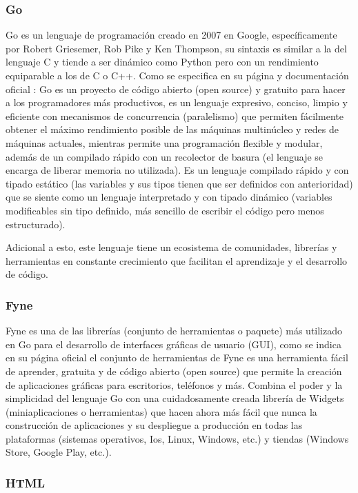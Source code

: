 \subsubsection{Go}
Go es un lenguaje de programación creado en 2007 en Google, específicamente por
Robert Griesemer, Rob Pike y Ken Thompson, su sintaxis es similar a la del lenguaje
C y tiende a ser dinámico como Python pero con un rendimiento equiparable a los
de C o C++. Como se especifica en su página y documentación oficial
\textcite{GolangDocumentacion}: Go es un proyecto de código abierto (open source)
y gratuito
para hacer a los programadores más productivos, es un lenguaje expresivo, conciso,
limpio y eficiente con mecanismos de concurrencia (paralelismo) que permiten fácilmente
obtener el máximo rendimiento posible de las máquinas multinúcleo y redes de máquinas
actuales, mientras permite una programación flexible y modular, además de un compilado
rápido con un recolector de basura (el lenguaje se encarga de liberar memoria
no utilizada).
Es un lenguaje compilado rápido y con tipado estático (las variables y sus tipos tienen que
ser definidos con anterioridad) que se siente como un lenguaje interpretado y
con tipado dinámico (variables modificables sin tipo definido, más sencillo de
escribir el código pero menos estructurado).

Adicional a esto, este lenguaje tiene un ecosistema de comunidades, librerías y
herramientas en constante crecimiento que facilitan el aprendizaje y el desarrollo
de código.

\subsubsection{Fyne}

Fyne es una de las librerías (conjunto de herramientas o paquete) más utilizado
en Go para el desarrollo de interfaces gráficas de usuario (GUI), como se
indica en su página oficial \textcite{fyne}
el conjunto de herramientas de Fyne es una herramienta fácil de aprender, gratuita
y de código abierto (open source) que permite la creación de aplicaciones gráficas
para escritorios, teléfonos y más. Combina el poder y la simplicidad del lenguaje
Go con una cuidadosamente creada librería de Widgets (miniaplicaciones o herramientas)
que hacen ahora más fácil que nunca la construcción de aplicaciones y su despliegue
a producción en todas las plataformas (sistemas operativos, Ios, Linux, Windows, etc.)
y tiendas (Windows Store, Google Play, etc.).

\subsubsection{HTML}

